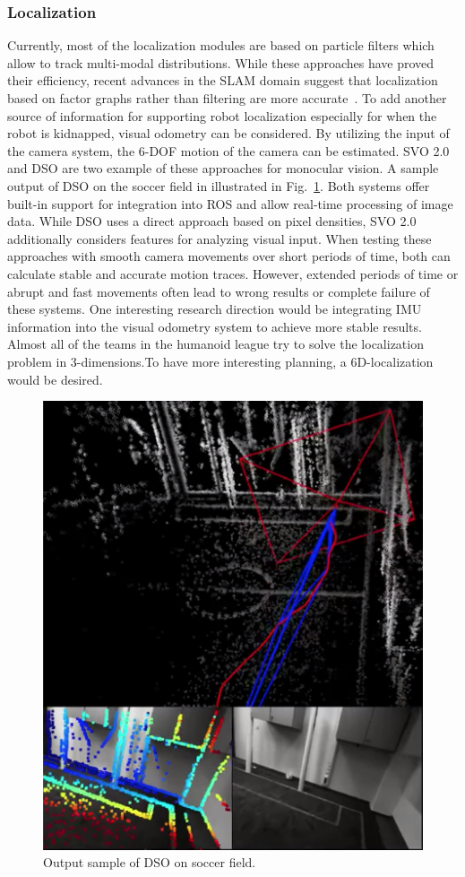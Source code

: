 \documentclass{article}
\begin{document}
\subsubsection{Localization}
Currently, most of the localization modules are based on particle filters which allow to track multi-modal distributions. 
While these approaches have proved their efficiency, recent advances in the SLAM domain suggest that localization based on factor graphs rather than filtering are more accurate~\cite{Strasdat2012}.
To add another source of information for supporting robot localization especially for when the robot is kidnapped, visual odometry can be considered.
By utilizing the input of the camera system, the 6-DOF motion of the camera can be estimated. SVO 2.0 \cite{forster2014svo} and DSO \cite{engel2018direct} are two example of these approaches for monocular vision.
A sample output of DSO on the soccer field in illustrated in Fig.~\ref{FigDSO}.
Both systems offer built-in support for integration into ROS and allow real-time processing of image data. 
While DSO uses a direct approach based on pixel densities, SVO 2.0 additionally considers features for analyzing visual input. 
When testing these approaches with smooth camera movements over short periods of time, both can calculate stable and accurate motion traces. 
However, extended periods of time or abrupt and fast movements often lead to wrong results or complete failure of these systems. 
One interesting research direction would be integrating IMU information into the visual odometry system to achieve more stable results.
Almost all of the teams in the humanoid league try to solve the localization problem in 3-dimensions.To have more interesting planning, a 6D-localization would be desired.
\begin{figure}[h]
	\centering
		\includegraphics[width=0.5\linewidth]{dso}\vspace{-1ex}
	\caption{ Output sample of DSO on soccer field.}
	\label{FigDSO}
\end{figure}
\end{document}
